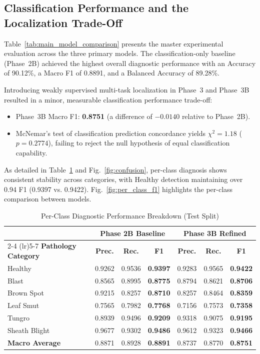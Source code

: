 \documentclass[conference]{IEEEtran}
\begin{document}
\subsection{Classification Performance and the Localization Trade-Off}
Table~\ref{tab:main_model_comparison} presents the master experimental evaluation across the three primary models. The classification-only baseline (Phase~2B) achieved the highest overall diagnostic performance with an Accuracy of 90.12\%, a Macro F1 of 0.8891, and a Balanced Accuracy of 89.28\%.

Introducing weakly supervised multi-task localization in Phase~3 and Phase~3B resulted in a minor, measurable classification performance trade-off:
\begin{itemize}
    \item Phase~3B Macro F1: \textbf{0.8751} (a difference of $-0.0140$ relative to Phase~2B).
    \item McNemar's test of classification prediction concordance yields $\chi^2 = 1.18$ ($p = 0.2774$), failing to reject the null hypothesis of equal classification capability.
\end{itemize}

As detailed in Table~\ref{tab:per_class} and Fig.~\ref{fig:confusion}, per-class diagnosis shows consistent stability across categories, with Healthy detection maintaining over 0.94 F1 (0.9397 vs. 0.9422). Fig.~\ref{fig:per_class_f1} highlights the per-class comparison between models.

\begin{table}[htbp]
\centering
\caption{Per-Class Diagnostic Performance Breakdown (Test Split)}
\label{tab:per_class}
\footnotesize
\setlength{\tabcolsep}{3.5pt}
\begin{tabular}{lcccccc}
\toprule
 & \multicolumn{3}{c}{\textbf{Phase 2B Baseline}} & \multicolumn{3}{c}{\textbf{Phase 3B Refined}} \\
\cmidrule(lr){2-4} \cmidrule(lr){5-7}
\textbf{Pathology Category} & \textbf{Prec.} & \textbf{Rec.} & \textbf{F1} & \textbf{Prec.} & \textbf{Rec.} & \textbf{F1} \\
\midrule
Healthy & 0.9262 & 0.9536 & \textbf{0.9397} & 0.9283 & 0.9565 & \textbf{0.9422} \\
Blast & 0.8565 & 0.8995 & \textbf{0.8775} & 0.8794 & 0.8621 & \textbf{0.8706} \\
Brown Spot & 0.9215 & 0.8257 & \textbf{0.8710} & 0.8257 & 0.8464 & \textbf{0.8359} \\
Leaf Smut & 0.7565 & 0.7982 & \textbf{0.7768} & 0.7156 & 0.7573 & \textbf{0.7358} \\
Tungro & 0.8939 & 0.9496 & \textbf{0.9209} & 0.9318 & 0.9075 & \textbf{0.9195} \\
Sheath Blight & 0.9677 & 0.9302 & \textbf{0.9486} & 0.9612 & 0.9323 & \textbf{0.9466} \\
\midrule
\textbf{Macro Average} & 0.8871 & 0.8928 & \textbf{0.8891} & 0.8737 & 0.8770 & \textbf{0.8751} \\
\bottomrule
\end{tabular}
\end{table}
\end{document}
